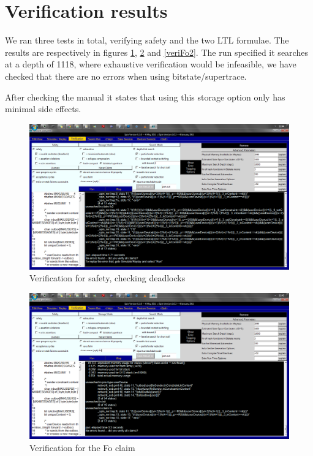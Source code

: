 \documentclass[10pt,a4paper]{article}
\begin{document}
	\section{Verification results}
	
	We ran three tests in total, verifying safety and the two LTL formulae. The results are respectively in figures \ref{veriSafety}, \ref{veriFo} and \ref{veriFo2}.
	The run specified it searches at a depth of 1118, where exhaustive verification would be infeasible, we have checked that there are no errors when using bitstate/supertrace.
	
	After checking the manual it states that using this storage option only has minimal side effects. 
	
	\begin{figure}[t]
		\includegraphics[angle=90,totalheight=\textheight]{screenshots/verification_safety.png}
		\caption{Verification for safety, checking deadlocks}
		\label{veriSafety}
	\end{figure}

	\begin{figure}[t]
		\includegraphics[angle=90,totalheight=\textheight]{screenshots/verification_fo.png}
		\caption{Verification for the Fo claim}
		\label{veriFo}
	\end{figure}
	
\end{document}
